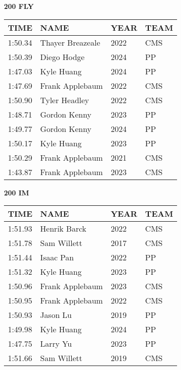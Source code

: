 \vspace{0.4cm}

\begin{minipage}[t]{0.48\textwidth}
\centering
\textbf{200 FLY}\\[0.05cm]
\begin{tabular}{@{}p{1.8cm}p{2.8cm}p{1.2cm}p{1.4cm}@{}}
\hline
\textbf{TIME} & \textbf{NAME} & \textbf{YEAR} & \textbf{TEAM} \\
\hline
1:50.34 & Thayer Breazeale & 2022 & CMS \\
1:50.39 & Diego Hodge & 2024 & PP \\
1:47.03 & Kyle Huang & 2024 & PP \\
1:47.69 & Frank Applebaum & 2022 & CMS \\
1:50.90 & Tyler Headley & 2022 & CMS \\
1:48.71 & Gordon Kenny & 2023 & PP \\
1:49.77 & Gordon Kenny & 2024 & PP \\
1:50.17 & Kyle Huang & 2023 & PP \\
1:50.29 & Frank Applebaum & 2021 & CMS \\
1:43.87 & Frank Applebaum & 2023 & CMS \\
\hline
\end{tabular}
\end{minipage}\hfill
\begin{minipage}[t]{0.48\textwidth}
\centering
\textbf{200 IM}\\[0.05cm]
\begin{tabular}{@{}p{1.8cm}p{2.8cm}p{1.2cm}p{1.4cm}@{}}
\hline
\textbf{TIME} & \textbf{NAME} & \textbf{YEAR} & \textbf{TEAM} \\
\hline
1:51.93 & Henrik Barck & 2022 & CMS \\
1:51.78 & Sam Willett & 2017 & CMS \\
1:51.44 & Isaac Pan & 2022 & PP \\
1:51.32 & Kyle Huang & 2023 & PP \\
1:50.96 & Frank Applebaum & 2023 & CMS \\
1:50.95 & Frank Applebaum & 2022 & CMS \\
1:50.93 & Jason Lu & 2019 & PP \\
1:49.98 & Kyle Huang & 2024 & PP \\
1:47.75 & Larry Yu & 2023 & PP \\
1:51.66 & Sam Willett & 2019 & CMS \\
\hline
\end{tabular}
\end{minipage}

